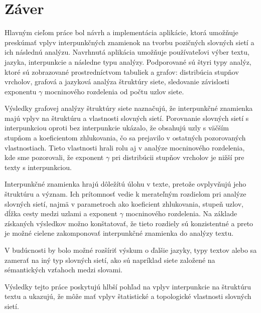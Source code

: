 \chapter*{Záver}

Hlavným cieľom práce bol návrh a implementácia aplikácie, ktorá umožňuje preskúmať vplyv interpunkčných znamienok na
tvorbu pozičných slovných sietí a ich následnú analýzu. Navrhnutá aplikácia umožňuje používateľovi výber textu, jazyka,
interpunkcie a následne typu analýzy. Podporované sú štyri typy analýz, ktoré sú zobrazované prostredníctvom
tabuliek a grafov: distribúcia stupňov vrcholov, grafová a jazyková analýza štruktúry siete, sledovanie závislosti exponentu
$\gamma$ mocninového rozdelenia od počtu uzlov siete.

Výsledky grafovej analýzy štruktúry siete naznačujú, že interpunkčné znamienka majú vplyv na štruktúru a vlastnosti
slovných sietí. Porovnanie slovných sietí s interpunkciou oproti bez interpunkcie ukázalo, že obsahujú uzly s väčším stupňom a
koeficientom zhlukovania, čo sa prejavilo v ostatných pozorovaných vlastnostiach. Tieto vlastnosti hrali rolu aj v analýze
mocninového rozdelenia, kde sme pozorovali, že exponent $\gamma$ pri distribúcii stupňov vrcholov je nižší pre texty s interpunkciou.

Interpunkčné znamienka hrajú dôležítú úlohu v texte, pretože ovplyvňujú jeho štruktúru a význam. Ich prítomnosť vedie k merateľným
rozdielom pri analýze slovných sietí, najmä v parametroch ako koeficient zhlukovania, stupeň uzlov, dĺžka cesty medzi uzlami a
exponent $\gamma$ mocninového rozdelenia. Na základe získaných výsledkov možno konštatovať, že tieto rozdiely sú konzistentné
a preto je možné cielene zakomponovať interpunkčné znamienka do analýzy textu.

V budúcnosti by bolo možné rozšíriť výskum o ďalšie jazyky, typy textov alebo sa zamerať na iný typ slovných sietí,
ako sú napríklad siete založené na sémantických vzťahoch medzi slovami.

Výsledky tejto práce poskytujú hlbší pohľad na vplyv interpunkcie na štruktúru textu a ukazujú, že môže mať vplyv
štatistické a topologické vlastnosti slovných sietí.